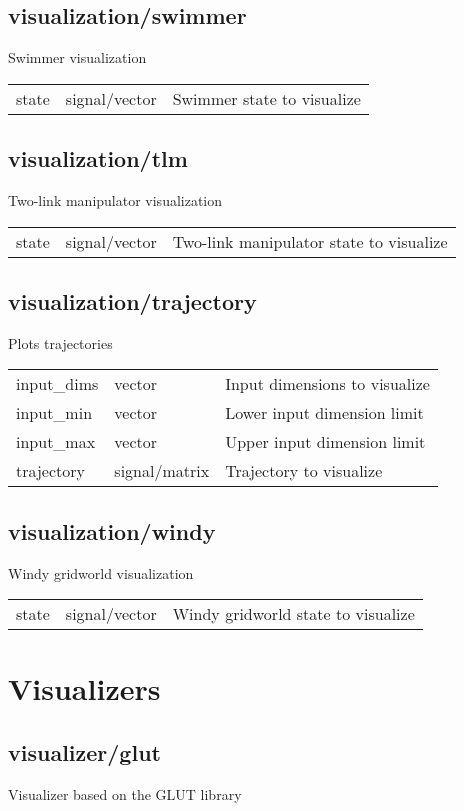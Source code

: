 \subsection{visualization/swimmer}
\noindent Swimmer visualization\\

\noindent\begin{tabular}{@{}lll@{}}
state&signal/vector&Swimmer state to visualize\\
\end{tabular}
\subsection{visualization/tlm}
\noindent Two-link manipulator visualization\\

\noindent\begin{tabular}{@{}lll@{}}
state&signal/vector&Two-link manipulator state to visualize\\
\end{tabular}
\subsection{visualization/trajectory}
\noindent Plots trajectories\\

\noindent\begin{tabular}{@{}lll@{}}
input\_dims&vector&Input dimensions to visualize\\
input\_min&vector&Lower input dimension limit\\
input\_max&vector&Upper input dimension limit\\
trajectory&signal/matrix&Trajectory to visualize\\
\end{tabular}
\subsection{visualization/windy}
\noindent Windy gridworld visualization\\

\noindent\begin{tabular}{@{}lll@{}}
state&signal/vector&Windy gridworld state to visualize\\
\end{tabular}
\section{Visualizers}
\subsection{visualizer/glut}
\noindent Visualizer based on the GLUT library\\

